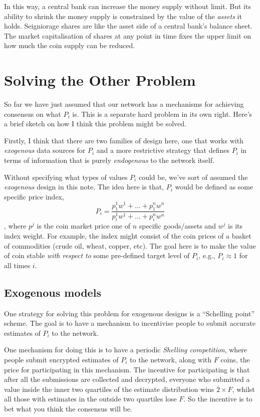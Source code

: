 \documentclass[twocolumn]{article}
\begin{document}
In this way, a central bank can increase the money supply without
limit. But its ability to shrink the money supply is constrained by
the value of the \emph{assets} it holds. Seigniorage shares are like
the asset side of a central bank's balance sheet. The market
capitalisation of shares at any point in time fixes the upper limit on
how much the coin supply can be reduced.

\section*{Solving the Other Problem}
So far we have just assumed that our network has a mechanisms for
achieving consensus on what $P_{i}$ is. This is a separate hard
problem in its own right. Here's a brief sketch on how I think this
problem might be solved.

Firstly, I think that there are two families of design here, one that
works with \emph{exogenous} data sources for $P_{i}$ and a more
restrictive strategy that defines $P_{i}$ in terms of information that
is purely \emph{endogenous} to the network itself.

Without specifying what types of values $P_{i}$ could be, we've sort
of assumed the \emph{exogenous} design in this note. The idea here is
that, $P_{i}$ would be defined as some specific price index,
\begin{equation}
P_{i} = \frac{p^{1}_{1}w^{1} + \dots + p^{n}_{1}w^{n}}{p^{1}_{i}w^{1} + \dots + p^{n}_{i}w^{n}}
\end{equation}
, where $p^{j}$ is the coin market price one of $n$ specific
goods/assets and $w^{j}$ is its index weight. For example, the index
might consist of the coin prices of a basket of commodities (crude
oil, wheat, copper, etc). The goal here is to make the value of coin
stable \emph{with respect to} some pre-defined target level of
$P_{i}$, e.g., $P_{i} \approx 1$ for all times $i$.

\subsection*{Exogenous models}
One strategy for solving this problem for exogenous designs is a
``Schelling point'' scheme. The goal is to have a mechanism to
incentivise people to submit accurate estimates of $P_{i}$ to the
network.

One mechanism for doing this is to have a periodic \emph{Shelling
  competition}, where people submit encrypted estimates of $P_{i}$ to
the network, along with $F$ coins, the price for participating in this
mechanism. The incentive for participating is that after all the
submissions are collected and decrypted, everyone who submitted a
value inside the inner two quartiles of the estimate distribution wins
$2\times F$, whilst all those with estimates in the outside two
quartiles lose $F$. So the incentive is to bet what you think the
consensus will be.
\end{document}
